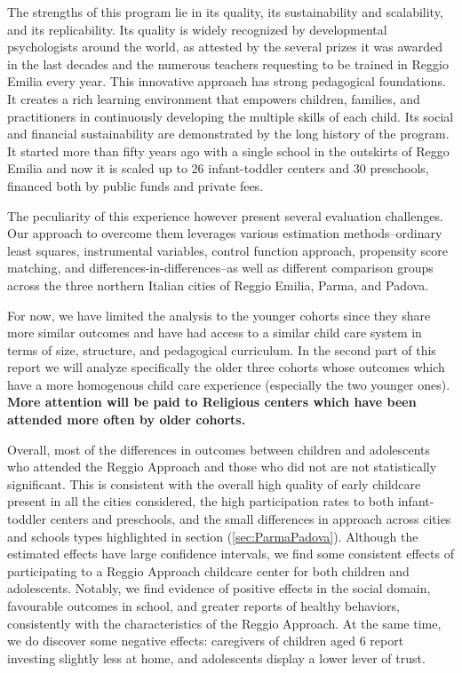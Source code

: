 \documentclass[12pt]{article}
\begin{document}
The strengths of this program lie in its quality, its sustainability and
scalability, and its replicability. Its quality is widely recognized by
developmental psychologists around the world, as attested by the several
prizes it was awarded in the last decades and the numerous teachers
requesting to be trained in Reggio Emilia every year. This innovative
approach has strong pedagogical foundations. It creates a rich learning
environment that empowers children, families, and practitioners in
continuously developing the multiple skills of each child. Its social and
financial sustainability are demonstrated by the long history of the
program. It started more than fifty years ago with a single school in the
outskirts of Reggo Emilia and now it is scaled up to 26 infant-toddler
centers and 30 preschools, financed both by public funds and private fees.

The peculiarity of this experience however present several evaluation
challenges. Our approach to overcome them leverages various estimation
methods--ordinary least squares, instrumental variables, control function
approach, propensity score matching, and differences-in-differences--as well
as different comparison groups across the three northern Italian cities of
Reggio Emilia, Parma, and Padova.

For now, we have limited the analysis to the younger cohorts since they
share more similar outcomes and have had access to a similar child care
system in terms of size, structure, and pedagogical curriculum. In the
second part of this report we will analyze specifically the older three
cohorts whose outcomes which have a more homogenous child care experience
(especially the two younger ones). \textbf{More attention will be paid to
Religious centers which have been attended more often by older cohorts.}

Overall, most of the differences in outcomes between children and
adolescents who attended the Reggio Approach and those who did not are not
statistically significant. This is consistent with the overall high quality
of early childcare present in all the cities considered, the high
participation rates to both infant-toddler centers and preschools, and the
small differences in approach across cities and schools types highlighted in
section (\ref{sec:ParmaPadova}). Although the estimated effects have large
confidence intervals, we find some consistent effects of participating to a
Reggio Approach childcare center for both children and adolescents. Notably,
we find evidence of positive effects in the social domain, favourable
outcomes in school, and greater reports of healthy behaviors, consistently
with the characteristics of the Reggio Approach. At the same time, we do
discover some negative effects: caregivers of children aged 6 report
investing slightly less at home, and adolescents display a lower lever of
trust.

\pagebreak 


\end{document}
